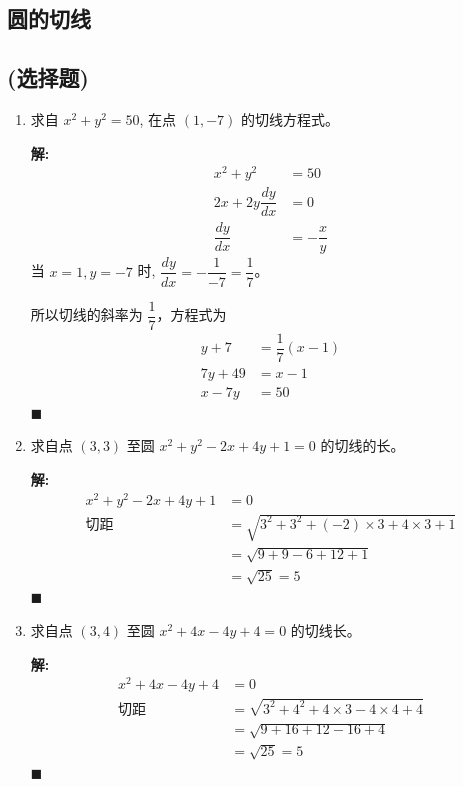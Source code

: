 \documentclass[10pt]{article}
\newcommand{\sol}{\textbf{解:} }
\begin{document}
\newpage
\subsection{圆的切线}
\subsection*{(选择题)}

\begin{enumerate}[leftmargin=*]
  \item 求自 $x^{2}+y^{2}=50$, 在点 $(1,-7)$ 的切线方程式。

        \sol{}
        \begin{align*}
          x^{2}+y^{2}          & = 50            \\
          2x+2y \dfrac{dy}{dx} & = 0             \\
          \dfrac{dy}{dx}       & = -\dfrac{x}{y}
        \end{align*}
        当 $x = 1, y = -7$ 时, $\dfrac{dy}{dx} = -\dfrac{1}{-7} = \dfrac{1}{7}$。

        所以切线的斜率为 $\dfrac{1}{7}$，方程式为
        \begin{align*}
          y+7     & = \dfrac{1}{7}(x-1) \\
          7y + 49 & = x - 1             \\
          x - 7y  & = 50
        \end{align*} \hfill$\blacksquare$

  \item 求自点 $(3,3)$ 至圆 $x^{2}+y^{2}-2 x+4 y+1=0$ 的切线的长。

        \sol{}
        \begin{align*}
          x^{2}+y^{2}-2 x+4 y+1 & = 0                                                 \\
          \text{切距}             & = \sqrt{3^2 + 3^2 + (-2) \times 3 + 4 \times 3 + 1} \\
                                & = \sqrt{9 + 9 - 6 + 12 + 1}                         \\
                                & = \sqrt{25} = 5
        \end{align*} \hfill$\blacksquare$

  \item 求自点 $(3,4)$ 至圆 $x^{2}+4 x-4 y+4=0$ 的切线长。

        \sol{}
        \begin{align*}
          x^{2}+4 x-4 y+4 & = 0                                              \\
          \text{切距}       & = \sqrt{3^2 + 4^2 + 4 \times 3 - 4 \times 4 + 4} \\
                          & = \sqrt{9 + 16 + 12 - 16 + 4}                    \\
                          & = \sqrt{25} = 5
        \end{align*} \hfill$\blacksquare$


\end{enumerate}
\end{document}
